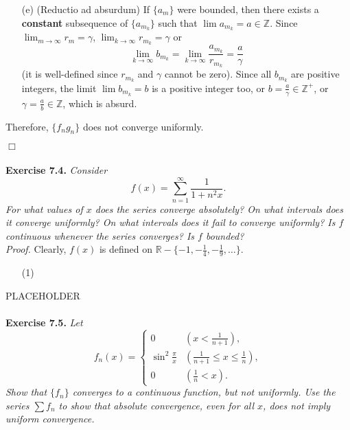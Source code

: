 \documentclass{article}
\begin{document}
\begin{enumerate}
\begin{enumerate}
    \item[(e)]
      (Reductio ad absurdum)
      If $\{a_m\}$ were bounded, then there exists
      a \textbf{constant} subsequence of $\{a_{m_k}\}$
      such that $\lim a_{m_k} = a \in \mathbb{Z}$.
      Since $\lim_{m \to \infty} r_m = \gamma$, $\lim_{k \to \infty} r_{m_k} = \gamma$ or
      \[
        \lim_{k \to \infty} b_{m_k}
        = \lim_{k \to \infty} \frac{a_{m_k}}{r_{m_k}}
        = \frac{a}{\gamma}
      \]
      (it is well-defined since $r_{m_k}$ and $\gamma$ cannot be zero).
      Since all $b_{m_k}$ are positive integers,
      the limit $\lim b_{m_k} = b$ is a positive integer too,
      or $b = \frac{a}{\gamma} \in \mathbb{Z}^+$, or $\gamma = \frac{a}{b} \in \mathbb{Z}$,
      which is absurd.
  \end{enumerate}
  Therefore, $\{f_n g_n\}$ does not converge uniformly.
\end{enumerate}
$\Box$ \\\\






\textbf{Exercise 7.4.}
\emph{Consider
\[
  f(x) = \sum_{n=1}^{\infty} \frac{1}{1+n^2x}.
\]
For what values of $x$ does the series converge absolutely?
On what intervals does it converge uniformly?
On what intervals does it fail to converge uniformly?
Is $f$ continuous whenever the series converges?
Is $f$ bounded?} \\

\emph{Proof.}
Clearly, $f(x)$ is defined on
$\mathbb{R} - \{ -1, -\frac{1}{4}, -\frac{1}{9}, \ldots \}$.
\begin{enumerate}
  \item[(1)]
\end{enumerate}

PLACEHOLDER \\\\






\textbf{Exercise 7.5.}
\emph{Let
\begin{equation*}
  f_n(x) =
    \begin{cases}
      0                    & (x < \frac{1}{n+1}), \\
      \sin^2 \frac{\pi}{x} & (\frac{1}{n+1} \leq x \leq \frac{1}{n}), \\
      0                    & (\frac{1}{n} < x).
    \end{cases}
\end{equation*}
Show that $\{f_n\}$ converges to a continuous function, but not uniformly.
Use the series $\sum f_n$ to show that absolute convergence, even for all $x$,
does not imply uniform convergence.} \\
\end{document}
